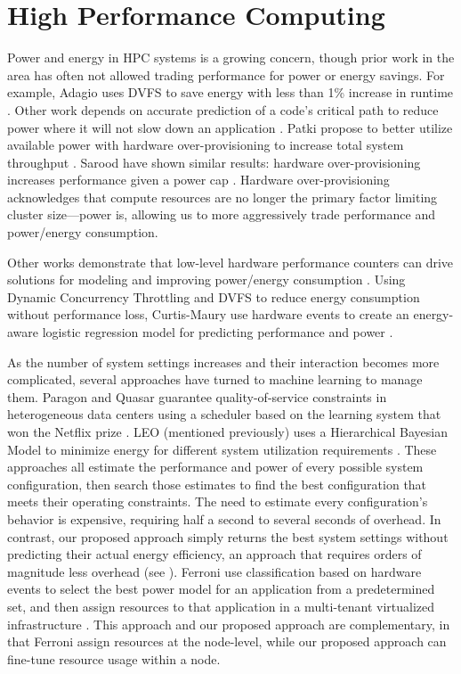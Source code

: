 \section{High Performance Computing}

Power and energy in HPC systems is a growing concern, though prior work in the area has often not allowed trading performance for power or energy savings.
For example, Adagio uses DVFS to save energy with less than 1\% increase in runtime \cite{RountreeAdagio}.
Other work depends on accurate prediction of a code's critical path to reduce power where it will not slow down an application \cite{Jitter,Marathe2015}.
Patki \etal propose to better utilize available power with hardware over-provisioning to increase total system throughput \cite{PatkiRMAP}.
Sarood \etal have shown similar results: hardware over-provisioning increases performance given a power cap \cite{Sarood2013}.
Hardware over-provisioning acknowledges that compute resources are no longer the primary factor limiting cluster size---power is, allowing us to more aggressively trade performance and power/energy consumption.

Other works demonstrate that low-level hardware performance counters can drive solutions for modeling and improving power/energy consumption \cite{Libutti2014,Sasaki,Chetsa,WuHPCComputer}.
Using Dynamic Concurrency Throttling and DVFS to reduce energy consumption without performance loss, Curtis-Maury \etal use hardware events to create an energy-aware logistic regression model for predicting performance and power \cite{Curtis-Maury2008}.

As the number of system settings increases and their interaction becomes more complicated, several approaches have turned to machine learning to manage them.
Paragon \cite{Paragon} and Quasar \cite{quasar} guarantee quality-of-service constraints in heterogeneous data centers using a scheduler based on the learning system that won the Netflix prize \cite{NetflixPrize}.
LEO (mentioned previously) uses a Hierarchical Bayesian Model to minimize energy for different system utilization requirements \cite{LEO}.
These approaches all estimate the performance and power of every possible system configuration, then search those estimates to find the best configuration that meets their operating constraints.
The need to estimate every configuration's behavior is expensive, requiring half a second \cite{LEO} to several seconds \cite{Paragon} of overhead.
In contrast, our proposed approach simply returns the best system settings without predicting their actual energy efficiency, an approach that requires orders of magnitude less overhead (see ).
Ferroni \etal use classification based on hardware events to select the best power model for an application from a predetermined set, and then assign resources to that application in a multi-tenant virtualized infrastructure \cite{FerroniTACO}.
This approach and our proposed approach are complementary, in that Ferroni \etal assign resources at the node-level, while our proposed approach can fine-tune resource usage within a node.

